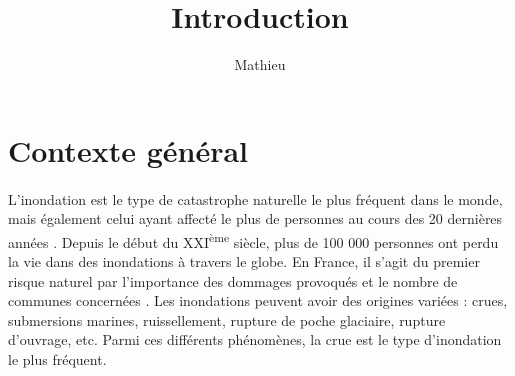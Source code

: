 \documentclass[11pt]{article}
\title{Introduction}
\author{Mathieu}
\begin{document}
\maketitle

\tableofcontents

\newpage

\section{Contexte général}

	\paragraph{} L'inondation est le type de catastrophe naturelle le plus fréquent dans le monde, mais également celui ayant affecté le plus de personnes au cours des 20 dernières années \citep{undrr_human_2020}. Depuis le début du XXI\textsuperscript{ème} siècle, plus de 100 000 personnes ont perdu la vie dans des inondations à travers le globe. En France, il s'agit du premier risque naturel par l'importance des dommages provoqués et le nombre de communes concernées \citep{medd_prevention_2023}. Les inondations peuvent avoir des origines variées : crues, submersions marines, ruissellement, rupture de poche glaciaire, rupture d'ouvrage, etc. Parmi ces différents phénomènes, la crue est le type d'inondation le plus fréquent. 
	
\end{document}
